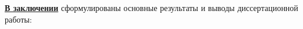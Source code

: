 \newpage
\underline{\textbf{В заключении}} сформулированы основные результаты и выводы диссертационной работы: %





